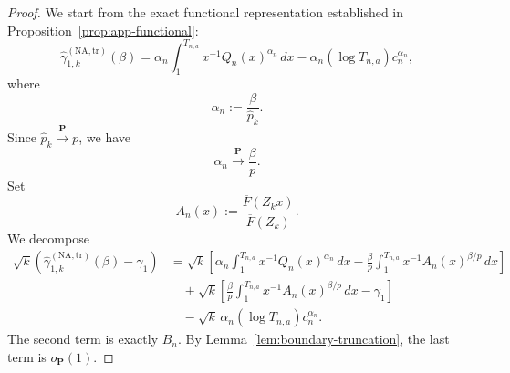 \documentclass[10pt,a4paper]{amsart}
\begin{document}
\begin{proof}
We start from the exact functional representation established in
Proposition~\ref{prop:app-functional}:
\[
\widehat{\gamma}_{1,k}^{(\mathrm{NA,tr})}(\beta)=\alpha_{n}\int_{1}^{T_{n,a}%
}x^{-1}Q_{n}(x)^{\alpha_{n}}\,dx-\alpha_{n}(\log T_{n,a})c_{n}^{\alpha_{n}},
\]
where
\[
\alpha_{n}:=\frac{\beta}{\widehat{p}_{k}}.
\]
Since $\widehat{p}_{k}\overset{\mathbf{P}}{\longrightarrow}p$, we have
\[
\alpha_{n}\overset{\mathbf{P}}{\longrightarrow}\frac{\beta}{p}.
\]
Set
\[
A_{n}(x):=\frac{\overline{F}(Z_{k}x)}{\overline{F}(Z_{k})}.
\]
We decompose
\[
\begin{aligned}
		\sqrt{k}\left(
		\widehat{\gamma}_{1,k}^{(\mathrm{NA,tr})}(\beta)-\gamma_{1}
		\right)
		&=
		\sqrt{k}
		\left[
		\alpha_n\int_{1}^{T_{n,a}}x^{-1}Q_n(x)^{\alpha_n}\,dx
		-
		\frac{\beta}{p}\int_{1}^{T_{n,a}}x^{-1}A_n(x)^{\beta/p}\,dx
		\right]  \\
		&\quad+
		\sqrt{k}
		\left[
		\frac{\beta}{p}\int_{1}^{T_{n,a}}x^{-1}A_n(x)^{\beta/p}\,dx
		-\gamma_1
		\right]  \\
		&\quad-
		\sqrt{k}\,\alpha_n(\log T_{n,a})c_n^{\alpha_n}.
	\end{aligned}
\]
The second term is exactly $B_{n}$. By Lemma~\ref{lem:boundary-truncation},
the last term is $o_{\mathbf{P}}(1)$.


\end{proof}
\end{document}
